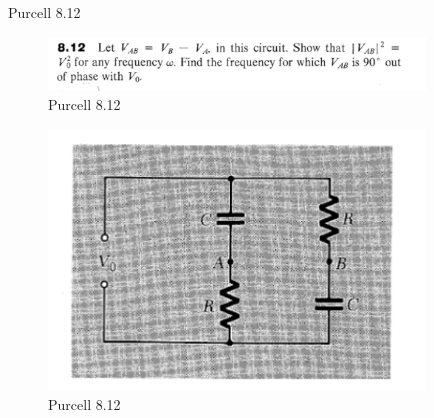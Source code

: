 \documentclass[makesolutionspdf]{esg8022pset}
\begin{document}
\begin{problem}{Purcell 8.12}
  \begin{figure}[H]
    \centering
    \includegraphics[width = 10cm]{pu812}
    \caption{Purcell 8.12}
  \end{figure}
  
  \begin{figure}[H]
    \centering
    \includegraphics[width = 10cm]{figpu812}
    \caption{Purcell 8.12}
  \end{figure}
\end{problem}
\end{document}
